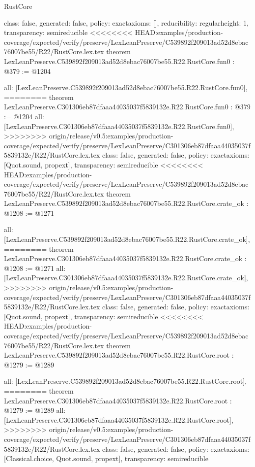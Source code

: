 \begin{lexlean}{RustCore}
\begin{coremodule}
{\begin{coremodule}
{{{  class: false,
  generated: false,
  policy: exact{axioms: []},
  reducibility: regular{height: 1},
  transparency: semireducible
}
<<<<<<<< HEAD:examples/production-coverage/expected/verify/preserve/LexLeanPreserve/C539892f209013ad52d8ebac76007be55/R22/RustCore.lex.tex
theorem LexLeanPreserve.C539892f209013ad52d8ebac76007be55.R22.RustCore.fun0 : @379 := @1204 {
  all: [LexLeanPreserve.C539892f209013ad52d8ebac76007be55.R22.RustCore.fun0],
========
theorem LexLeanPreserve.C301306eb87dfaaa44035037f5839132e.R22.RustCore.fun0 : @379 := @1204 {
  all: [LexLeanPreserve.C301306eb87dfaaa44035037f5839132e.R22.RustCore.fun0],
>>>>>>>> origin/release/v0.5:examples/production-coverage/expected/verify/preserve/LexLeanPreserve/C301306eb87dfaaa44035037f5839132e/R22/RustCore.lex.tex
  class: false,
  generated: false,
  policy: exact{axioms: [Quot.sound, propext]},
  transparency: semireducible
}
<<<<<<<< HEAD:examples/production-coverage/expected/verify/preserve/LexLeanPreserve/C539892f209013ad52d8ebac76007be55/R22/RustCore.lex.tex
theorem LexLeanPreserve.C539892f209013ad52d8ebac76007be55.R22.RustCore.crate_ok : @1208 := @1271 {
  all: [LexLeanPreserve.C539892f209013ad52d8ebac76007be55.R22.RustCore.crate_ok],
========
theorem LexLeanPreserve.C301306eb87dfaaa44035037f5839132e.R22.RustCore.crate_ok : @1208 := @1271 {
  all: [LexLeanPreserve.C301306eb87dfaaa44035037f5839132e.R22.RustCore.crate_ok],
>>>>>>>> origin/release/v0.5:examples/production-coverage/expected/verify/preserve/LexLeanPreserve/C301306eb87dfaaa44035037f5839132e/R22/RustCore.lex.tex
  class: false,
  generated: false,
  policy: exact{axioms: [Quot.sound, propext]},
  transparency: semireducible
}
<<<<<<<< HEAD:examples/production-coverage/expected/verify/preserve/LexLeanPreserve/C539892f209013ad52d8ebac76007be55/R22/RustCore.lex.tex
theorem LexLeanPreserve.C539892f209013ad52d8ebac76007be55.R22.RustCore.root : @1279 := @1289 {
  all: [LexLeanPreserve.C539892f209013ad52d8ebac76007be55.R22.RustCore.root],
========
theorem LexLeanPreserve.C301306eb87dfaaa44035037f5839132e.R22.RustCore.root : @1279 := @1289 {
  all: [LexLeanPreserve.C301306eb87dfaaa44035037f5839132e.R22.RustCore.root],
>>>>>>>> origin/release/v0.5:examples/production-coverage/expected/verify/preserve/LexLeanPreserve/C301306eb87dfaaa44035037f5839132e/R22/RustCore.lex.tex
  class: false,
  generated: false,
  policy: exact{axioms: [Classical.choice, Quot.sound, propext]},
  transparency: semireducible
}

}}}}}
\end{coremodule}}
\end{coremodule}
\end{lexlean}
